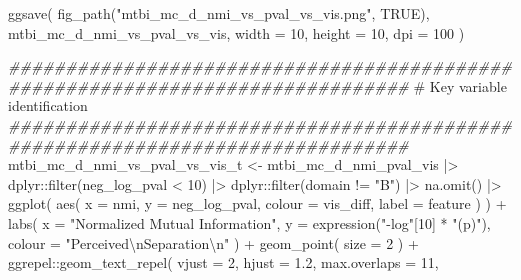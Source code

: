 \documentclass[
  letterpaper,
  DIV=11,
  numbers=noendperiod]{scrreprt}
\newenvironment{Shaded}{\begin{snugshade}}{\end{snugshade}}
\newcommand{\AttributeTok}[1]{\textcolor[rgb]{0.40,0.45,0.13}{#1}}
\newcommand{\CommentTok}[1]{\textcolor[rgb]{0.37,0.37,0.37}{#1}}
\newcommand{\ConstantTok}[1]{\textcolor[rgb]{0.56,0.35,0.01}{#1}}
\newcommand{\DecValTok}[1]{\textcolor[rgb]{0.68,0.00,0.00}{#1}}
\newcommand{\DocumentationTok}[1]{\textcolor[rgb]{0.37,0.37,0.37}{\textit{#1}}}
\newcommand{\FloatTok}[1]{\textcolor[rgb]{0.68,0.00,0.00}{#1}}
\newcommand{\FunctionTok}[1]{\textcolor[rgb]{0.28,0.35,0.67}{#1}}
\newcommand{\NormalTok}[1]{\textcolor[rgb]{0.00,0.23,0.31}{#1}}
\newcommand{\OtherTok}[1]{\textcolor[rgb]{0.00,0.23,0.31}{#1}}
\newcommand{\SpecialCharTok}[1]{\textcolor[rgb]{0.37,0.37,0.37}{#1}}
\newcommand{\StringTok}[1]{\textcolor[rgb]{0.13,0.47,0.30}{#1}}
\begin{document}
\begin{Shaded}
\begin{Highlighting}[]
\FunctionTok{ggsave}\NormalTok{(}
    \FunctionTok{fig\_path}\NormalTok{(}\StringTok{"mtbi\_mc\_d\_nmi\_vs\_pval\_vs\_vis.png"}\NormalTok{, }\ConstantTok{TRUE}\NormalTok{),}
\NormalTok{    mtbi\_mc\_d\_nmi\_vs\_pval\_vs\_vis,}
    \AttributeTok{width =} \DecValTok{10}\NormalTok{,}
    \AttributeTok{height =} \DecValTok{10}\NormalTok{,}
    \AttributeTok{dpi =} \DecValTok{100}
\NormalTok{)}

\DocumentationTok{\#\#\#\#\#\#\#\#\#\#\#\#\#\#\#\#\#\#\#\#\#\#\#\#\#\#\#\#\#\#\#\#\#\#\#\#\#\#\#\#\#\#\#\#\#\#\#\#\#\#\#\#\#\#\#\#\#\#\#\#\#\#\#\#\#\#\#\#\#\#\#\#\#\#\#\#\#\#\#}
\CommentTok{\# Key variable identification}
\DocumentationTok{\#\#\#\#\#\#\#\#\#\#\#\#\#\#\#\#\#\#\#\#\#\#\#\#\#\#\#\#\#\#\#\#\#\#\#\#\#\#\#\#\#\#\#\#\#\#\#\#\#\#\#\#\#\#\#\#\#\#\#\#\#\#\#\#\#\#\#\#\#\#\#\#\#\#\#\#\#\#\#}
\NormalTok{mtbi\_mc\_d\_nmi\_vs\_pval\_vs\_vis\_t }\OtherTok{\textless{}{-}}\NormalTok{ mtbi\_mc\_d\_nmi\_pval\_vis }\SpecialCharTok{|\textgreater{}}
\NormalTok{    dplyr}\SpecialCharTok{::}\FunctionTok{filter}\NormalTok{(neg\_log\_pval }\SpecialCharTok{\textless{}} \DecValTok{10}\NormalTok{) }\SpecialCharTok{|\textgreater{}}
\NormalTok{    dplyr}\SpecialCharTok{::}\FunctionTok{filter}\NormalTok{(domain }\SpecialCharTok{!=} \StringTok{"B"}\NormalTok{) }\SpecialCharTok{|\textgreater{}}
    \FunctionTok{na.omit}\NormalTok{() }\SpecialCharTok{|\textgreater{}}
    \FunctionTok{ggplot}\NormalTok{(}
        \FunctionTok{aes}\NormalTok{(}
            \AttributeTok{x =}\NormalTok{ nmi,}
            \AttributeTok{y =}\NormalTok{ neg\_log\_pval,}
            \AttributeTok{colour =}\NormalTok{ vis\_diff,}
            \AttributeTok{label =}\NormalTok{ feature}
\NormalTok{        )}
\NormalTok{    ) }\SpecialCharTok{+}
    \FunctionTok{labs}\NormalTok{(}
        \AttributeTok{x =} \StringTok{"Normalized Mutual Information"}\NormalTok{,}
        \AttributeTok{y =} \FunctionTok{expression}\NormalTok{(}\StringTok{"{-}log"}\NormalTok{[}\DecValTok{10}\NormalTok{] }\SpecialCharTok{*} \StringTok{"(p)"}\NormalTok{),}
        \AttributeTok{colour =} \StringTok{"Perceived}\SpecialCharTok{\textbackslash{}n}\StringTok{Separation}\SpecialCharTok{\textbackslash{}n}\StringTok{"}
\NormalTok{    ) }\SpecialCharTok{+}
    \FunctionTok{geom\_point}\NormalTok{(}
        \AttributeTok{size =} \DecValTok{2}
\NormalTok{    ) }\SpecialCharTok{+}
\NormalTok{    ggrepel}\SpecialCharTok{::}\FunctionTok{geom\_text\_repel}\NormalTok{(}
        \AttributeTok{vjust =} \DecValTok{2}\NormalTok{,}
        \AttributeTok{hjust =} \FloatTok{1.2}\NormalTok{,}
        \AttributeTok{max.overlaps =} \DecValTok{11}\NormalTok{,}

\end{Highlighting}
\end{Shaded}
\end{document}
